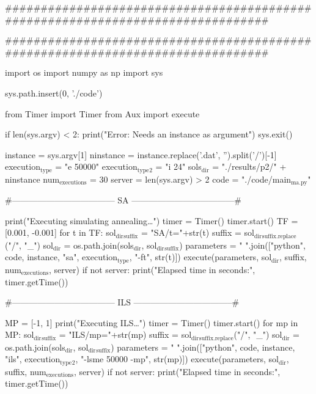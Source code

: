\documentclass[11pt]{article}
\author{Andrés Herrera Poyatos}
\date{\today}
\title{}
\begin{document}
\tableofcontents

\#\#\#\#\#\#\#\#\#\#\#\#\#\#\#\#\#\#\#\#\#\#\#\#\#\#\#\#\#\#\#\#\#\#\#\#\#\#\#\#\#\#\#\#\#\#\#\#\#\#\#\#\#\#\#\#\#\#\#\#\#\#\#\#\#\#\#\#\#\#\#\#\#\#\#\#\#\#\#\#

\#\#\#\#\#\#\#\#\#\#\#\#\#\#\#\#\#\#\#\#\#\#\#\#\#\#\#\#\#\#\#\#\#\#\#\#\#\#\#\#\#\#\#\#\#\#\#\#\#\#\#\#\#\#\#\#\#\#\#\#\#\#\#\#\#\#\#\#\#\#\#\#\#\#\#\#\#\#\#\#

import os
import numpy as np
import sys

sys.path.insert(0, './code')

from Timer import Timer
from Aux import execute

if len(sys.argv) < 2:
    print("Error: Needs an instance as argument")
    sys.exit()

instance = sys.argv[1]
ninstance = instance.replace('.dat', '').split('/')[-1]
execution\(_{\text{type}}\) = "e 50000"
execution\(_{\text{type}}\)\(_{\text{2}}\) = "i 24"
sols\(_{\text{dir}}\) = "./results/p2/" + ninstance 
num\(_{\text{executions}}\) = 30
server = len(sys.argv) > 2
code = "./code/main\(_{\text{ma.py}}\)"

\#------------------------------------ SA ------------------------------------\#

print("Executing simulating annealing\ldots{}")
timer = Timer()
timer.start()
TF = [0.001, -0.001]
for t in TF:
    sol\(_{\text{dir}}\)\(_{\text{suffix}}\) = "SA/t="+str(t)
    suffix = sol\(_{\text{dir}}\)\(_{\text{suffix.replace}}\)("/", "\_")
    sol\(_{\text{dir}}\) = os.path.join(sols\(_{\text{dir}}\), sol\(_{\text{dir}}\)\(_{\text{suffix}}\))
    parameters = " ".join(["python", code, instance, "sa", execution\(_{\text{type}}\),
                            "-ft", str(t)])
    execute(parameters, sol\(_{\text{dir}}\), suffix, num\(_{\text{executions}}\), server)
if not server:
    print("Elapsed time in seconds:", timer.getTime())

\#------------------------------------ ILS -----------------------------------\#

MP = [-1, 1]
print("Executing ILS\ldots{}")
timer = Timer()
timer.start()
for mp in MP:
    sol\(_{\text{dir}}\)\(_{\text{suffix}}\) = "ILS/mp="+str(mp)
    suffix = sol\(_{\text{dir}}\)\(_{\text{suffix.replace}}\)("/", "\_")
    sol\(_{\text{dir}}\) = os.path.join(sols\(_{\text{dir}}\), sol\(_{\text{dir}}\)\(_{\text{suffix}}\))
    parameters = " ".join(["python", code, instance, "ils", execution\(_{\text{type}}\)\(_{\text{2}}\),
                            "-lsme 50000 -mp", str(mp)])
    execute(parameters, sol\(_{\text{dir}}\), suffix, num\(_{\text{executions}}\), server)
if not server:
    print("Elapsed time in seconds:", timer.getTime())
\end{document}
